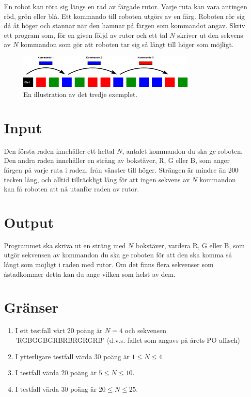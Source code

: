 
En robot kan röra sig längs en rad av färgade rutor. Varje ruta kan
vara antingen röd, grön eller blå. Ett kommando till roboten utgörs av
en färg. Roboten rör sig då åt höger och stannar när den hamnar på
färgen som kommandot angav. Skriv ett program som, för en given följd
av rutor och ett tal $N$ skriver ut den sekvens av $N$ kommandon som
gör att roboten tar sig så långt till höger som möjligt.

\begin{figure}[ht!]
\centering
\includegraphics[width=0.8\textwidth]{fargrobot.png}
\caption{En illustration av det tredje exemplet.}
\label{overflow}
\end{figure}


\section*{Input}
Den första raden innehåller ett heltal $N$, antalet kommandon du ska
ge roboten. Den andra raden innehåller en sträng av bokstäver, R, G eller B, som
anger färgen på varje ruta i raden, från vänster till höger. Strängen är mindre än
200 tecken lång, och alltid tillräckligt lång för att ingen sekvens
av $N$ kommandon kan få roboten att nå utanför raden av rutor.

\section*{Output}

Programmet ska skriva ut en sträng med $N$ bokstäver, vardera R, G
eller B, som utgör sekvensen av kommandon du ska ge roboten för att
den ska komma så långt som möjligt i raden med rutor. Om det finns
flera sekvenser som åstadkommer detta kan du ange vilken som helst av dem.

\section*{Gränser}

\begin{enumerate}
\item I ett testfall värt 20 poäng är $N=4$ och sekvensen
  'RGBGGBGRBRBRGRGRB' (d.v.s. fallet som angavs på årets PO-affisch)
\item I ytterligare testfall värda 30 poäng är $1 \le N \le 4$.
\item I testfall värda 20 poäng är $5 \le N \le 10$. 
\item I testfall värda 30 poäng är $20 \le N \le 25$.
\end{enumerate}

